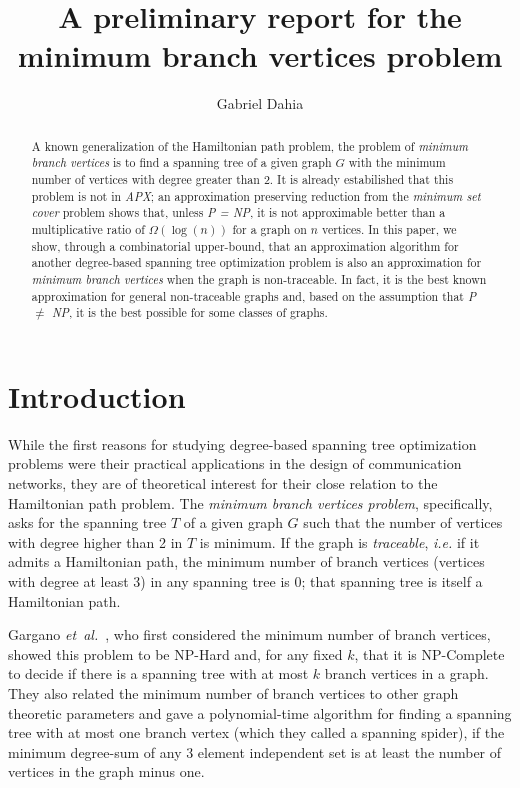\documentclass[12pt]{article}
\title{A preliminary report for the minimum branch vertices problem}
\author{Gabriel Dahia\inst{1}}
\begin{document}
 

\maketitle

\begin{abstract}
  A known generalization of the Hamiltonian path problem, the problem of \emph{minimum branch vertices} is to find a spanning tree of a given graph $G$ with the minimum number of vertices with degree greater than 2.
  It is already estabilished that this problem is not in \emph{APX}; an approximation preserving reduction from the \emph{minimum set cover} problem shows that, unless \emph{P = NP}, it is not approximable better than a multiplicative ratio of $\Omega(\log(n))$ for a graph on $n$ vertices.
  In this paper, we show, through a combinatorial upper-bound, that an approximation algorithm for another degree-based spanning tree optimization problem is also an approximation for \emph{minimum branch vertices} when the graph is non-traceable.
  In fact, it is the best known approximation for general non-traceable graphs and, based on the assumption that \emph{P $\neq$ NP}, it is the best possible for some classes of graphs.
\end{abstract}
     
\section{Introduction}

While the first reasons for studying degree-based spanning tree optimization problems were their practical applications in the design of communication networks, they are of theoretical interest for their close relation to the Hamiltonian path problem.
The \emph{minimum branch vertices problem}, specifically, asks for the spanning tree $T$ of a given graph $G$ such that the number of vertices with degree higher than 2 in $T$ is minimum.
If the graph is \emph{traceable}, \emph{i.e.} if it admits a Hamiltonian path, the minimum number of branch vertices (vertices with degree at least 3) in any spanning tree is 0; that spanning tree is itself a Hamiltonian path.

Gargano \emph{et~al.}~\cite{gargano2002, gargano2004}, who first considered the minimum number of branch vertices, showed this problem to be NP-Hard and, for any fixed $k$, that it is NP-Complete to decide if there is a spanning tree with at most $k$ branch vertices in a graph.
They also related the minimum number of branch vertices to other graph theoretic parameters and gave a polynomial-time algorithm for finding a spanning tree with at most one branch vertex (which they called a spanning spider), if the minimum degree-sum of any 3 element independent set is at least the number of vertices in the graph minus one.



\end{document}
